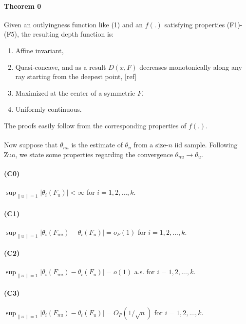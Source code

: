\documentclass{article}
\begin{document}
\paragraph{Theorem 0} Given an outlyingness function like (1) and an $f(.)$ satisfying properties (F1)-(F5), the resulting depth function is:
\begin{enumerate}
\item Affine invariant,

\item Quasi-concave, and as a result $D(x,F)$ decreases monotonically along any ray starting from the deepest point, [ref]

\item Maximized at the center of a symmetric $F$.

\item Uniformly continuous.
\end{enumerate}
The proofs easily follow from the corresponding properties of $f(.)$.

\paragraph{}Now suppose that $\theta_{nu}$ is the estimate of $\theta_u$ from a size-$n$ iid sample. Following Zuo, we state some properties regarding the convergence $\theta_{nu}\rightarrow\theta_u$.

\paragraph{(C0)} $ \sup_{\|u\|=1} |\theta_i(F_u)| < \infty$ for $i=1,2,...,k$.

\paragraph{(C1)} $ \sup_{\|u\|=1} |\theta_i(F_{nu})-\theta_i(F_u)| = o_P(1)$ for $i=1,2,...,k$.

\paragraph{(C2)} $ \sup_{\|u\|=1} |\theta_i(F_{nu})-\theta_i(F_u)| = o(1)$ a.s. for $i=1,2,...,k$.

\paragraph{(C3)} $ \sup_{\|u\|=1} |\theta_i(F_{nu})-\theta_i(F_u)| = O_P(1/\sqrt n)$ for $i=1,2,...,k$.
\end{document}

